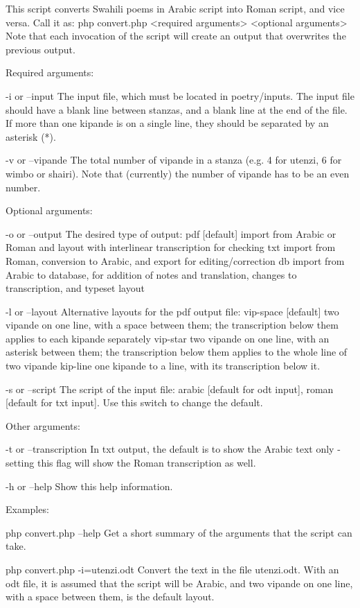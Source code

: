 \documentclass[a4paper,10pt, oneside]{book}
\begin{document}
This script converts Swahili poems in Arabic script into Roman script, and vice versa.  Call it as:
php convert.php <required arguments> <optional arguments>
Note that each invocation of the script will create an output that overwrites the previous output.

Required arguments:

-i or --input           The input file, which must be located in poetry/inputs.  The input file should have a blank line between stanzas, and a blank line at the end of the file.  If more than one kipande is on a single line, they should be separated by an asterisk (*).

-v or --vipande         The total number of vipande in a stanza (e.g. 4 for utenzi, 6 for wimbo or shairi).  Note that (currently) the number of vipande has to be an even number.

Optional arguments:

-o or --output          The desired type of output: 
    pdf [default]       import from Arabic or Roman and layout with interlinear transcription for checking
    txt                 import from Roman, conversion to Arabic, and export for editing/correction
    db                  import from Arabic to database, for addition of notes and translation, changes to transcription, and typeset layout

-l or --layout          Alternative layouts for the pdf output file:
    vip-space [default] two vipande on one line, with a space between them; the transcription below them applies to each kipande separately
    vip-star            two vipande on one line, with an asterisk between them; the transcription below them applies to the whole line of two vipande
    kip-line            one kipande to a line, with its transcription below it.

-s or --script          The script of the input file: arabic [default for odt input], roman [default for txt input].  Use this switch to change the default.

Other arguments:

-t or --transcription   In txt output, the default is to show the Arabic text only - setting this flag will show the Roman transcription as well.

-h or --help            Show this help information.

Examples:

php convert.php --help
Get a short summary of the arguments that the script can take.

php convert.php -i=utenzi.odt
Convert the text in the file utenzi.odt.  With an odt file, it is assumed that the script will be Arabic, and two vipande on one line, with a space between them, is the default layout.
\end{document}
